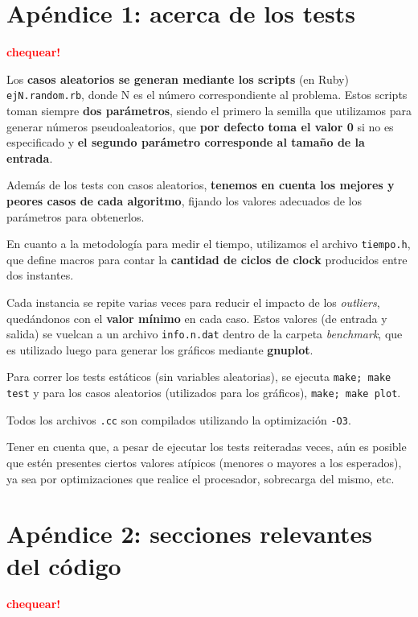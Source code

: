 \documentclass[a4paper]{article}
\begin{document}
\newpage

\section{Apéndice 1: acerca de los tests}

\textcolor{red}{\textbf{chequear!}} \medskip

Los \textbf{casos aleatorios se generan mediante los scripts} (en Ruby) \verb|ejN.random.rb|, donde
N es el número correspondiente al problema. Estos scripts toman siempre \textbf{dos parámetros},
siendo el primero la semilla que utilizamos para generar números pseudoaleatorios, que
\textbf{por defecto toma el valor 0} si no es especificado y \textbf{el segundo parámetro corresponde
al tamaño de la entrada}.

Además de los tests con casos aleatorios, \textbf{tenemos en cuenta los mejores y peores
casos de cada algoritmo}, fijando los valores adecuados de los parámetros para
obtenerlos. \medskip

En cuanto a la metodología para medir el tiempo, utilizamos el archivo \verb|tiempo.h|,
que define macros para contar la \textbf{cantidad de ciclos de clock} producidos entre dos instantes. \medskip

Cada instancia se repite varias veces para reducir el impacto de los \textit{outliers}, quedándonos
con el \textbf{valor mínimo} en cada caso. Estos valores (de entrada y salida) se vuelcan a un archivo
\verb|info.n.dat| dentro de la carpeta \textit{benchmark}, que es utilizado luego para generar los gráficos
mediante \textbf{gnuplot}. \medskip

Para correr los tests estáticos (sin variables aleatorias), se ejecuta \verb|make; make test| y para los
casos aleatorios (utilizados para los gráficos), \verb|make; make plot|.

Todos los archivos \verb|.cc| son compilados utilizando la optimización \verb|-O3|. \medskip

Tener en cuenta que, a pesar de ejecutar los tests reiteradas veces, aún es posible que estén presentes ciertos
valores atípicos (menores o mayores a los esperados), ya sea por optimizaciones que realice el procesador, sobrecarga
del mismo, etc.
\newpage

\section{Apéndice 2: secciones relevantes del código}

\textcolor{red}{\textbf{chequear!}} \medskip
\end{document}
